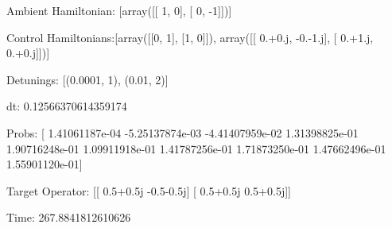 \documentclass{article}
\begin{document}
    

\newpage

Ambient Hamiltonian: [array([[ 1,  0],
       [ 0, -1]])]

Control Hamiltonians:[array([[0, 1],
       [1, 0]]), array([[ 0.+0.j, -0.-1.j],
       [ 0.+1.j,  0.+0.j]])]

Detunings: [(0.0001, 1), (0.01, 2)]

 dt: 0.12566370614359174

Probs: [  1.41061187e-04  -5.25137874e-03  -4.41407959e-02   1.31398825e-01
   1.90716248e-01   1.09911918e-01   1.41787256e-01   1.71873250e-01
   1.47662496e-01   1.55901120e-01]

Target Operator: [[ 0.5+0.5j -0.5-0.5j]
 [ 0.5+0.5j  0.5+0.5j]]

Time: 267.8841812610626
\end{document}
